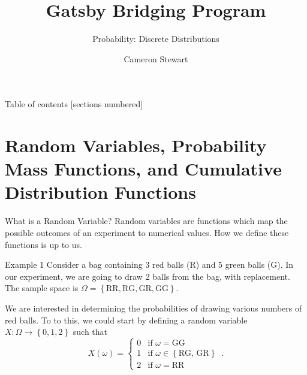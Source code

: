 \documentclass[10pt]{beamer}
\title{Gatsby Bridging Program}
\subtitle{Probability: Discrete Distributions}
\date{}
\author{Cameron Stewart}
\institute{Gatsby Computational Neuroscience Unit}
\begin{document}
\maketitle

\begin{frame}{Table of contents}
  [sections numbered]
  \tableofcontents%
\end{frame}

\section{Random Variables, Probability Mass Functions, and Cumulative Distribution Functions}

\begin{frame}[fragile]{What is a Random Variable?}
Random variables are functions which map the possible outcomes of an experiment to numerical values. How we define these functions is up to us.
\begin{exampleblock}{Example 1}
Consider a bag containing 3 red balls (R) and 5 green balls (G). In our experiment, we are going to draw 2 balls from the bag, with replacement. The sample space is \(\Omega = \left\{\text{RR}, \text{RG}, \text{GR}, \text{GG}\right\}\).

We are interested in determining the probabilities of drawing various numbers of red balls. To to this, we could start by defining a random variable \(X: \Omega \rightarrow \left\{0, 1, 2\right\}\) such that
\begin{equation*}
    X\left(\omega\right) =
    \begin{cases}
        0 & \text{if } \omega = \text{GG}\\
        1 & \text{if } \omega \in \left\{\text{RG, GR}\right\}\\
        2 & \text{if } \omega = \text{RR}
    \end{cases}\,.
\end{equation*}
\end{exampleblock}
\end{frame}
\end{document}

